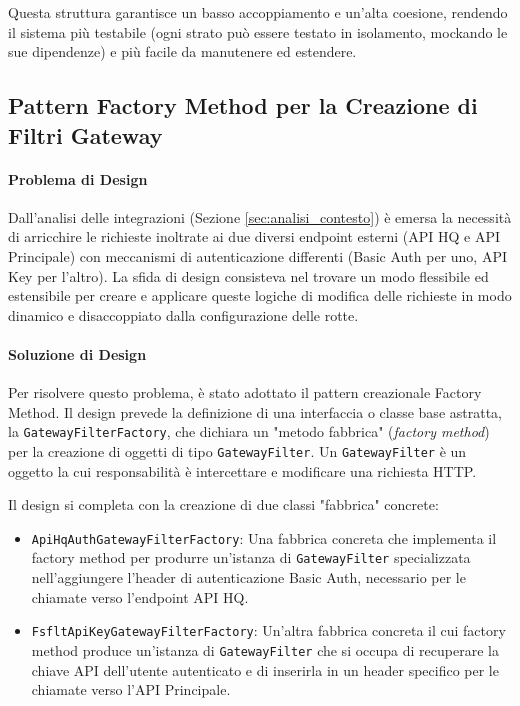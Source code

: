\documentclass[12pt,a4paper,openright,twoside]{book}
\begin{document}
Questa struttura garantisce un basso accoppiamento e un'alta coesione, rendendo il sistema più testabile (ogni strato può essere testato in isolamento, mockando le sue dipendenze) e più facile da manutenere ed estendere.



\FloatBarrier

\subsection{Pattern Factory Method per la Creazione di Filtri Gateway}
\label{subsec:design_factory}

\paragraph{Problema di Design}
Dall'analisi delle integrazioni (Sezione \ref{sec:analisi_contesto}) è emersa la necessità di arricchire le richieste inoltrate ai due diversi endpoint esterni (API HQ e API Principale) con meccanismi di autenticazione differenti (Basic Auth per uno, API Key per l'altro). La sfida di design consisteva nel trovare un modo flessibile ed estensibile per creare e applicare queste logiche di modifica delle richieste in modo dinamico e disaccoppiato dalla configurazione delle rotte.


\paragraph{Soluzione di Design}
Per risolvere questo problema, è stato adottato il pattern creazionale Factory Method. Il design prevede la definizione di una interfaccia o classe base astratta, la \texttt{GatewayFilterFactory}, che dichiara un "metodo fabbrica" (\textit{factory method}) per la creazione di oggetti di tipo \texttt{GatewayFilter}. Un \texttt{GatewayFilter} è un oggetto la cui responsabilità è intercettare e modificare una richiesta HTTP.

Il design si completa con la creazione di due classi "fabbrica" concrete:
\begin{itemize}
    \item \texttt{ApiHqAuthGatewayFilterFactory}: Una fabbrica concreta che implementa il factory method per produrre un'istanza di \texttt{GatewayFilter} specializzata nell'aggiungere l'header di autenticazione Basic Auth, necessario per le chiamate verso l'endpoint API HQ.
    \item \texttt{FsfltApiKeyGatewayFilterFactory}: Un'altra fabbrica concreta il cui factory method produce un'istanza di \texttt{GatewayFilter} che si occupa di recuperare la chiave API dell'utente autenticato e di inserirla in un header specifico per le chiamate verso l'API Principale.
\end{itemize}
\end{document}
